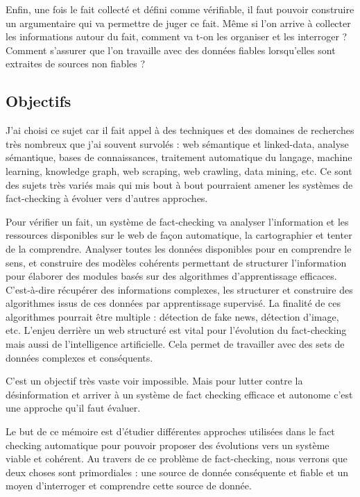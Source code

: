 Enfin, une fois le fait collecté et défini comme vérifiable, il faut pouvoir construire un argumentaire qui va permettre de juger ce fait. Même si l'on arrive à collecter les informations autour du fait, comment va t-on les organiser et les interroger ? Comment s'assurer que l'on travaille avec des données fiables lorsqu'elles sont extraites de sources non fiables ? 

\subsection{Objectifs}

J'ai choisi ce sujet car il fait appel à des techniques et des domaines de recherches très nombreux que j'ai souvent survolés : web sémantique et linked-data, analyse sémantique, bases de connaissances, traitement automatique du langage, machine learning, knowledge graph, web scraping, web crawling, data mining, etc. Ce sont des sujets très variés mais qui mis bout à bout pourraient amener les systèmes de fact-checking à évoluer vers d'autres approches. 

Pour vérifier un fait, un système de fact-checking va analyser l'information et les ressources disponibles sur le web de façon automatique, la cartographier et tenter de la comprendre. Analyser toutes les données disponibles pour en comprendre le sens, et construire des modèles cohérents permettant de structurer l'information pour élaborer des modules basés sur des algorithmes d'apprentissage efficaces. C'est-à-dire récupérer des informations complexes, les structurer et construire des algorithmes issus de ces données par apprentissage supervisé. La finalité de ces algorithmes pourrait être multiple : détection de fake news, détection d'image, etc. L'enjeu derrière un web structuré est vital pour l'évolution du fact-checking mais aussi de l'intelligence artificielle. Cela permet de travailler avec des sets de données complexes et conséquents.

C'est un objectif très vaste voir impossible. Mais pour lutter contre la désinformation et arriver à un système de fact checking efficace et autonome c'est une approche qu'il faut évaluer.

Le but de ce mémoire est d'étudier différentes approches utilisées dans le fact checking automatique pour pouvoir proposer des évolutions vers un système viable et cohérent. Au travers de ce problème de fact-checking, nous verrons que deux choses sont primordiales : une source de donnée conséquente et fiable et un moyen d'interroger et comprendre cette source de donnée.